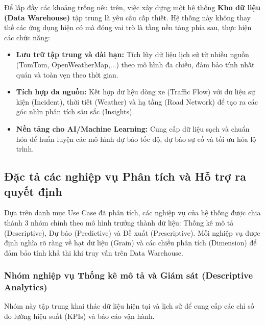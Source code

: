 Để lấp đầy các khoảng trống nêu trên, việc xây dựng một hệ thống \textbf{Kho dữ liệu (Data Warehouse)} tập trung là yêu cầu cấp thiết. Hệ thống này không thay thế các ứng dụng hiện có mà đóng vai trò là tầng nền tảng phía sau, thực hiện các chức năng:
\begin{itemize}
    \item \textbf{Lưu trữ tập trung và dài hạn:} Tích lũy dữ liệu lịch sử từ nhiều nguồn (TomTom, OpenWeatherMap,...) theo mô hình đa chiều, đảm bảo tính nhất quán và toàn vẹn theo thời gian.
    \item \textbf{Tích hợp đa nguồn:} Kết hợp dữ liệu dòng xe (Traffic Flow) với dữ liệu sự kiện (Incident), thời tiết (Weather) và hạ tầng (Road Network) để tạo ra các góc nhìn phân tích sâu sắc (Insights).
    \item \textbf{Nền tảng cho AI/Machine Learning:} Cung cấp dữ liệu sạch và chuẩn hóa để huấn luyện các mô hình dự báo tốc độ, dự báo sự cố và tối ưu hóa lộ trình.
\end{itemize}

\subsection{Đặc tả các nghiệp vụ Phân tích và Hỗ trợ ra quyết định}

Dựa trên danh mục Use Case đã phân tích, các nghiệp vụ của hệ thống được chia thành 3 nhóm chính theo mô hình trưởng thành dữ liệu: Thống kê mô tả (Descriptive), Dự báo (Predictive) và Đề xuất (Prescriptive). Mỗi nghiệp vụ được định nghĩa rõ ràng về hạt dữ liệu (Grain) và các chiều phân tích (Dimension) để đảm bảo tính khả thi khi truy vấn trên Data Warehouse.

\subsubsection{Nhóm nghiệp vụ Thống kê mô tả và Giám sát (Descriptive Analytics)}

Nhóm này tập trung khai thác dữ liệu hiện tại và lịch sử để cung cấp các chỉ số đo lường hiệu suất (KPIs) và báo cáo vận hành.

